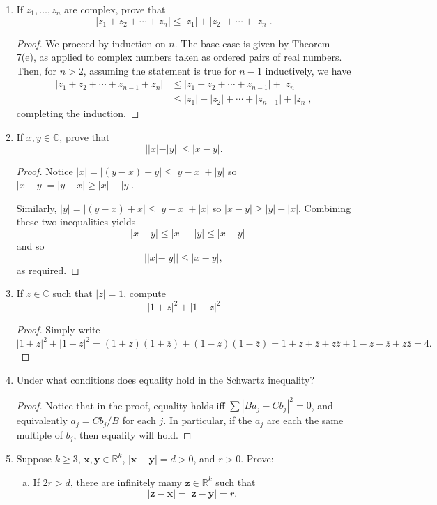 \documentclass{scrbook}
\newcommand{\R}{\mathbb{R}}
\newcommand{\C}{\mathbb{C}}
\renewcommand{\bar}{\overline}
\begin{document}
\begin{enumerate}
\item If $z_1, \dotsc, z_n$ are complex, prove that
\[
	|z_1 + z_2 + \dotsb + z_n| \le |z_1| + |z_2| + \dotsb + |z_n|.
\]

\begin{proof}
We proceed by induction on $n$. The base case is given by Theorem 7(e), as applied to complex numbers taken as ordered pairs of real numbers. Then, for $n > 2$, assuming the statement is true for $n - 1$ inductively, we have
\begin{align*}
	|z_1 + z_2 + \dotsb + z_{n-1} + z_n| &\le |z_1 + z_2 + \dotsb + z_{n-1}| + |z_n| \\
		&\le |z_1| + |z_2| + \dotsb + |z_{n-1}| + |z_n|,
\end{align*}
completing the induction.
\end{proof}

\item If $x, y \in \C$, prove that 
\[
	||x| - |y|| \le |x - y|.
\]

\begin{proof}
Notice $|x| = |(y - x) - y| \le |y - x| + |y|$ so $|x - y| = |y - x| \ge |x| - |y|$. 

Similarly, $|y| = |(y - x) + x| \le |y - x| + |x|$ so $|x - y| \ge |y| - |x|$. Combining these two inequalities yields
\[
	-|x - y| \le |x| - |y| \le |x - y| 
\]
and so
\[
	||x| - |y|| \le |x - y|,
\]
as required.
\end{proof}

\item If $z \in \C$ such that $|z| = 1$, compute
\[
	|1 + z|^2 + |1 - z|^2
\]

\begin{proof}
Simply write
\[
	|1 + z|^2 + |1 - z|^2 = (1 + z)(1 + \bar{z}) + (1 - z)(1 - \bar{z}) = 1 + z + \bar{z} + z\bar{z} + 1 - z - \bar{z} + z\bar{z} = 4.
\]
\end{proof}

\item Under what conditions does equality hold in the Schwartz inequality?

\begin{proof}
Notice that in the proof, equality holds iff $\sum |Ba_j - Cb_j|^2 = 0$, and equivalently $a_j = Cb_j/B$ for each $j$. In particular, if the $a_j$ are each the same multiple of $b_j$, then equality will hold.
\end{proof}

\item Suppose $k \ge 3$, $\textbf{x}, \textbf{y} \in \R^k$, $|\textbf{x} - \textbf{y}| = d > 0$, and $r > 0$. Prove:
\begin{enumerate}[(a)]
\item If $2r > d$, there are infinitely many $\textbf{z} \in \R^k$ such that 
\[
	|\textbf{z} - \textbf{x}| = |\textbf{z} - \textbf{y}| = r.
\]


\end{enumerate}
\end{enumerate}
\end{document}
